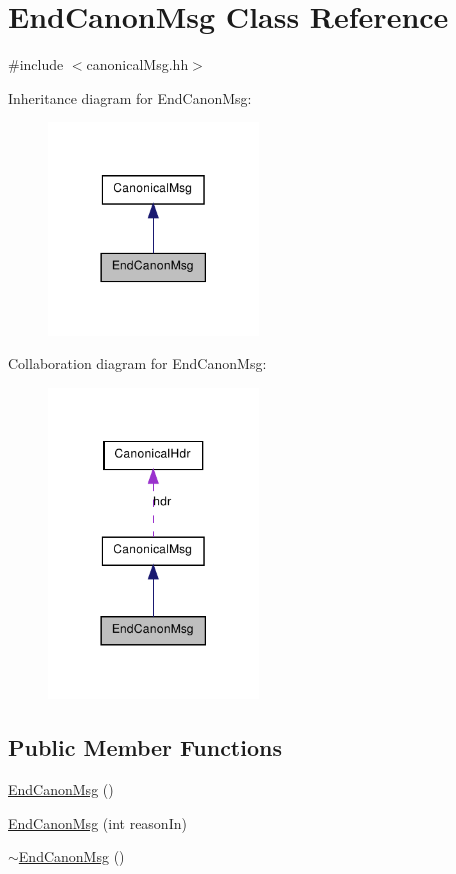 \hypertarget{class_end_canon_msg}{
\section{EndCanonMsg Class Reference}
\label{class_end_canon_msg}
}


{\ttfamily \#include $<$canonicalMsg.hh$>$}



Inheritance diagram for EndCanonMsg:\nopagebreak
\begin{figure}[H]
\begin{center}
\leavevmode
\includegraphics[width=158pt]{class_end_canon_msg__inherit__graph}
\end{center}
\end{figure}


Collaboration diagram for EndCanonMsg:\nopagebreak
\begin{figure}[H]
\begin{center}
\leavevmode
\includegraphics[width=158pt]{class_end_canon_msg__coll__graph}
\end{center}
\end{figure}
\subsection*{Public Member Functions}
\begin{DoxyCompactItemize}
\item 
\hyperlink{class_end_canon_msg_a8581204a18959908e6034f7b61c1b0f5}{EndCanonMsg} ()
\item 
\hyperlink{class_end_canon_msg_a7dda78bafe176888f5926ac7562e4eb7}{EndCanonMsg} (int reasonIn)
\item 
\hyperlink{class_end_canon_msg_a7d916d2072591c4d2f24410a69d8746e}{$\sim$EndCanonMsg} ()
\end{DoxyCompactItemize}
